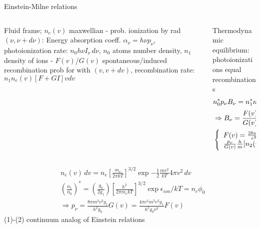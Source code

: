 \begin{frame}{Einstein-Milne relations}
    \begin{columns}[T]
        \begin{column}{0.55\textwidth}
            Fluid frame; $n_e(v)$ maxwellian - prob. ionization by rad $(\nu,\nu+d\nu)$: Energy absorption coeff. $\alpha_{\nu}=h\nu p_{\nu}$,
            photoionization rate: $n_0h\nu I_{\nu}\,d\nu$, $n_0$ atoms number density, $n_1$ density of ions - $F(v)$/$G(v)$ spontaneous/induced recombination prob for \Pelectron with $(v,v+dv)$, recombination rate: $n_1n_e(v)[F+GI]vdv$
        \end{column}
        \begin{column}{0.45\textwidth}
            Thermodynamic equilibrium: photoionizations equal recombinations
            \begin{align*}
                &n_0^*p_{\nu}B_{\nu}=n_1^*n_e(v)[F(v)+G(v)B_{\nu}]\\
                &\Rightarrow B_{\nu}=\frac{F(v)}{G(v)}{(\frac{n_0^*p_{\nu}m_e}{n_1^*n_e(v)hG(v)}-1)}^{-1}\\
                &\left\{\begin{array}{l}F(v)=\frac{2h\nu^3}{c^2}G(v)\\\frac{p_{\nu}}{G(v)}\frac{h}{m}[n_2(v)(\frac{n_1}{n_0})^*]e^{h\nu/kT}\\
                \end{array}\right.\tag{1}
            \end{align*}
        \end{column}
    \end{columns}
    \begin{align}
        &n_e(v)\,dv=n_e[\frac{m_e}{2\pi kT}]^{3/2}\exp{-\frac{1}{2}\frac{mv^2}{kT}}4\pi v^2\,dv\tag{TE: $n_e$ maxwell.}\\
        &(\frac{n_1}{n_0})^*=(\frac{g_0}{2g_1})[\frac{h^2}{2\pi m_ekT}]^{3/2}\exp{\epsilon_{ion}/kT}=n_e\phi_0\tag{Saha eq.}\\
        &\Rightarrow p_{\nu}=\frac{8\pi m^2v^2g_1}{h^2g_0}G(v)=\frac{4\pi c^2m^2v^2g_1}{h^3g_0\nu^3}F(v)\tag{2}
    \end{align}
 (1)-(2) continuum analog of Einstein relations   
\end{frame}

